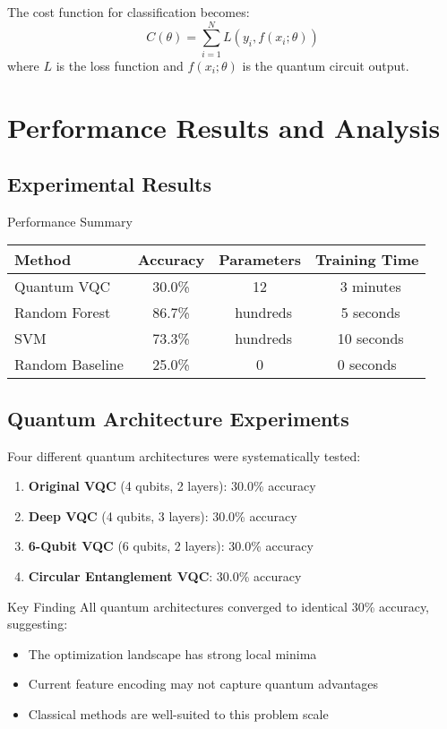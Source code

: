 \documentclass[11pt,a4paper]{article}
\begin{document}
The cost function for classification becomes:
$$C(\theta) = \sum_{i=1}^{N} L(y_i, f(x_i; \theta))$$
where $L$ is the loss function and $f(x_i; \theta)$ is the quantum circuit output.

\section{Performance Results and Analysis}

\subsection{Experimental Results}

\begin{resultbox}{Performance Summary}
\begin{center}
\begin{tabular}{|l|c|c|c|}
\hline
\textbf{Method} & \textbf{Accuracy} & \textbf{Parameters} & \textbf{Training Time} \\
\hline
Quantum VQC & 30.0\% & 12 & ~3 minutes \\
Random Forest & 86.7\% & ~hundreds & ~5 seconds \\
SVM & 73.3\% & ~hundreds & ~10 seconds \\
Random Baseline & 25.0\% & 0 & 0 seconds \\
\hline
\end{tabular}
\end{center}
\end{resultbox}

\subsection{Quantum Architecture Experiments}

Four different quantum architectures were systematically tested:

\begin{enumerate}
    \item \textbf{Original VQC} (4 qubits, 2 layers): 30.0\% accuracy
    \item \textbf{Deep VQC} (4 qubits, 3 layers): 30.0\% accuracy  
    \item \textbf{6-Qubit VQC} (6 qubits, 2 layers): 30.0\% accuracy
    \item \textbf{Circular Entanglement VQC}: 30.0\% accuracy
\end{enumerate}

\begin{warningbox}{Key Finding}
All quantum architectures converged to identical 30\% accuracy, suggesting:
\begin{itemize}
    \item The optimization landscape has strong local minima
    \item Current feature encoding may not capture quantum advantages
    \item Classical methods are well-suited to this problem scale
\end{itemize}
\end{warningbox}
\end{document}
